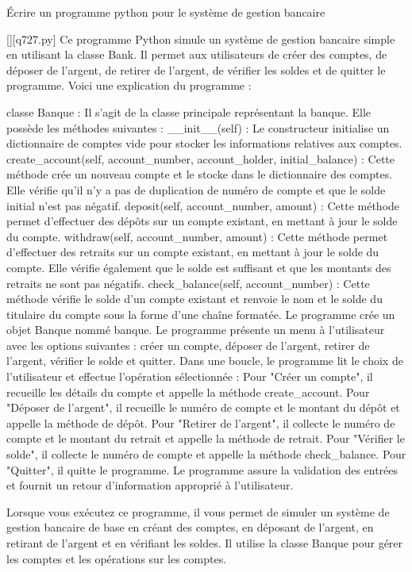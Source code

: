         \question
        Écrire un programme python pour le système de gestion bancaire
        \par
        \begin{solution}
            \renewcommand{\nomfichier}{q727.py}
            \pythonfile{\chemincode \nomfichier}[][\nomfichier]
            Ce programme Python simule un système de gestion bancaire simple en utilisant la classe Bank. Il permet aux utilisateurs de créer des comptes, de déposer de l'argent, de retirer de l'argent, de vérifier les soldes et de quitter le programme. Voici une explication du programme :

    classe Banque : Il s'agit de la classe principale représentant la banque. Elle possède les méthodes suivantes :
        __init__(self) : Le constructeur initialise un dictionnaire de comptes vide pour stocker les informations relatives aux comptes.
        create_account(self, account_number, account_holder, initial_balance) : Cette méthode crée un nouveau compte et le stocke dans le dictionnaire des comptes. Elle vérifie qu'il n'y a pas de duplication de numéro de compte et que le solde initial n'est pas négatif.
        deposit(self, account_number, amount) : Cette méthode permet d'effectuer des dépôts sur un compte existant, en mettant à jour le solde du compte.
        withdraw(self, account_number, amount) : Cette méthode permet d'effectuer des retraits sur un compte existant, en mettant à jour le solde du compte. Elle vérifie également que le solde est suffisant et que les montants des retraits ne sont pas négatifs.
        check_balance(self, account_number) : Cette méthode vérifie le solde d'un compte existant et renvoie le nom et le solde du titulaire du compte sous la forme d'une chaîne formatée.
    Le programme crée un objet Banque nommé banque.
    Le programme présente un menu à l'utilisateur avec les options suivantes : créer un compte, déposer de l'argent, retirer de l'argent, vérifier le solde et quitter.
    Dans une boucle, le programme lit le choix de l'utilisateur et effectue l'opération sélectionnée :
        Pour "Créer un compte", il recueille les détails du compte et appelle la méthode create_account.
        Pour "Déposer de l'argent", il recueille le numéro de compte et le montant du dépôt et appelle la méthode de dépôt.
        Pour "Retirer de l'argent", il collecte le numéro de compte et le montant du retrait et appelle la méthode de retrait.
        Pour "Vérifier le solde", il collecte le numéro de compte et appelle la méthode check_balance.
        Pour "Quitter", il quitte le programme.
    Le programme assure la validation des entrées et fournit un retour d'information approprié à l'utilisateur.

Lorsque vous exécutez ce programme, il vous permet de simuler un système de gestion bancaire de base en créant des comptes, en déposant de l'argent, en retirant de l'argent et en vérifiant les soldes. Il utilise la classe Banque pour gérer les comptes et les opérations sur les comptes.
        \end{solution}
        

